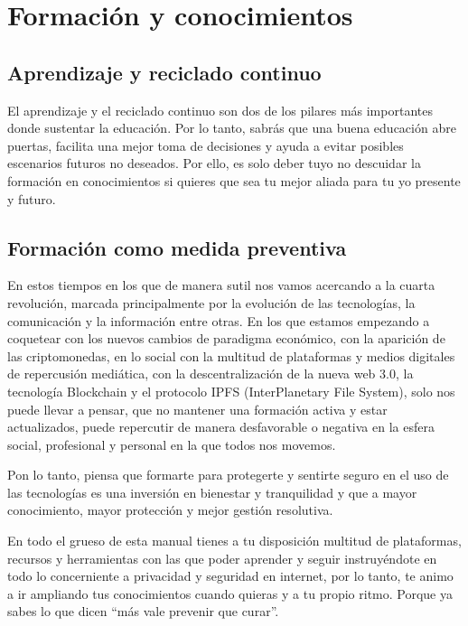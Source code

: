 \documentclass[
  a4paper,
  openany]{book}
\begin{document}
\hypertarget{formaciuxf3n-y-conocimientos}{%
\chapter{Formación y conocimientos}\label{formaciuxf3n-y-conocimientos}}

\hypertarget{aprendizaje-y-reciclado-continuo}{%
\section{Aprendizaje y reciclado continuo}\label{aprendizaje-y-reciclado-continuo}}

El aprendizaje y el reciclado continuo son dos de los pilares más importantes donde sustentar la educación. Por lo tanto, sabrás que una buena educación abre puertas, facilita una mejor toma de decisiones y ayuda a evitar posibles escenarios futuros no deseados. Por ello, es solo deber tuyo no descuidar la formación en conocimientos si quieres que sea tu mejor aliada para tu yo presente y futuro.

\hypertarget{formaciuxf3n-como-medida-preventiva}{%
\section{Formación como medida preventiva}\label{formaciuxf3n-como-medida-preventiva}}

En estos tiempos en los que de manera sutil nos vamos acercando a la cuarta revolución, marcada principalmente por la evolución de las tecnologías, la comunicación y la información entre otras. En los que estamos empezando a coquetear con los nuevos cambios de paradigma económico, con la aparición de las criptomonedas, en lo social con la multitud de plataformas y medios digitales de repercusión mediática, con la descentralización de la nueva web 3.0, la tecnología Blockchain y el protocolo IPFS (InterPlanetary File System), solo nos puede llevar a pensar, que no mantener una formación activa y estar actualizados, puede repercutir de manera desfavorable o negativa en la esfera social, profesional y personal en la que todos nos movemos.

Pon lo tanto, piensa que formarte para protegerte y sentirte seguro en el uso de las tecnologías es una inversión en bienestar y tranquilidad y que a mayor conocimiento, mayor protección y mejor gestión resolutiva.

En todo el grueso de esta manual tienes a tu disposición multitud de plataformas, recursos y herramientas con las que poder aprender y seguir instruyéndote en todo lo concerniente a privacidad y seguridad en internet, por lo tanto, te animo a ir ampliando tus conocimientos cuando quieras y a tu propio ritmo. Porque ya sabes lo que dicen ``más vale prevenir que curar''.
\end{document}
